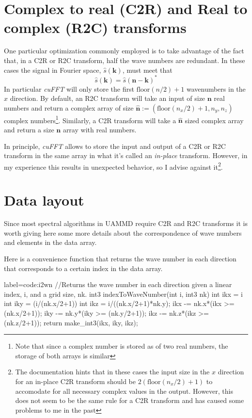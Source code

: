 \documentclass[ twoside,openright,titlepage,numbers=noenddot,%
headinclude,footinclude,cleardoublepage=empty,abstract=on,
BCOR=5mm,paper=b5,fontsize=11pt, dvipsnames
]{scrreprt}
\renewcommand{\vec}[1]{\bm{#1}}
\newcommand{\uammd}{\gls{UAMMD}\xspace}
\begin{document}
\section*{Complex to real (C2R) and Real to complex (R2C) transforms}

One particular optimization commonly employed is to take advantage of the fact that, in a C2R or R2C transform, half the wave numbers are redundant. In these cases the signal in Fourier space, $\hat{s}(\vec{k})$, must meet that
\begin{equation}
  \hat{s}(\vec{k}) = \hat{s}(\vec{n} - \vec{k})^*
\end{equation}
In particular \emph{cuFFT} will only store the first $\textrm{floor}(n/2)+1$ wavenumbers in the $x$ direction. By default, an R2C transform will take an input of size $\vec{n}$ real numbers and return a complex array of size $\hat{\vec{n}} := (\textrm{floor}(n_x/2)+1, n_y, n_z)$ complex numbers\footnote{Note that since a complex number is stored as of two real numbers, the storage of both arrays is similar}. Similarly, a C2R transform will take a $\hat{\vec{n}}$ sized complex array and return a size $\vec{n}$ array with real numbers.

In principle, \emph{cuFFT} allows to store the input and output of a C2R or R2C transform in the same array in what it's called an \emph{in-place} transform. However, in my experience this results in unexpected behavior, so I advise against it\footnote{The documentation hints that in these cases the input size in the $x$ direction for an in-place C2R transform should be $2(\textrm{floor}(n_x/2)+1)$ to accomodate for all necessary complex values in the output. However, this does not seem to be the same rule for a C2R transform and has caused some problems to me in the past}.

\section*{Data layout}
Since most spectral algorithms in \uammd require C2R and R2C transforms it is worth giving here some more details about the correspondence of wave numbers and elements in the data array.

Here is a convenience function that returns the wave number in each direction that corresponds to a certain index in the data array.
\begin{code2}{label=code:i2wn}
//Returns the wave number in each direction given a linear index, i, and a grid size, nk.
int3 indexToWaveNumber(int i, int3 nk){
  int ikx = i%
  int iky = (i/(nk.x/2+1))%
  int ikz = i/((nk.x/2+1)*nk.y);
  ikx -= nk.x*(ikx >= (nk.x/2+1));
  iky -= nk.y*(iky >= (nk.y/2+1));
  ikz -= nk.z*(ikz >= (nk.z/2+1));
  return make_int3(ikx, iky, ikz);
}
\end{code2}
\end{document}
